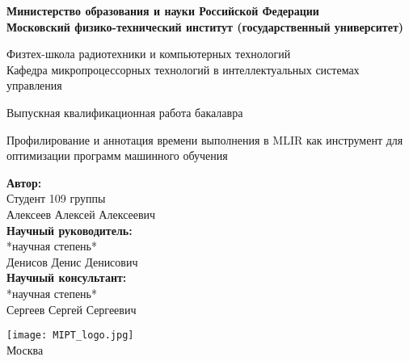 \begin{center}
    \large\textbf{Министерство образования и науки Российской Федерации \\
    Московский физико-технический институт (государственный
    университет)} \\
    \vspace{1cm}

    Физтех-школа радиотехники и компьютерных технологий \\

    Кафедра микропроцессорных технологий в интеллектуальных системах управления \\

    \vspace{3em}

    Выпускная квалификационная работа бакалавра
\end{center}

\begin{center}
    \vspace{\fill}
    \LARGE{Профилирование и аннотация времени выполнения в MLIR как инструмент для оптимизации программ машинного обучения}

    \vspace{\fill}
\end{center}


\begin{flushright}
    \textbf{Автор:} \\
    Студент 109 группы \\
    Алексеев Алексей Алексеевич \\
    \vspace{2em}
    \textbf{Научный руководитель:} \\
    *научная степень* \\
    Денисов Денис Денисович \\
    \vspace{2em}
    \textbf{Научный консультант:} \\
    *научная степень* \\
    Сергеев Сергей Сергеевич \\
\end{flushright}

\vspace{7em}

\begin{center}
    \texttt{[image: MIPT\_logo.jpg]}\\
    Москва \the\year{}
\end{center}

\thispagestyle{empty}

\newpage
\setcounter{page}{2}
\fancyfoot[c]{\thepage}
\fancyhead[R]{}